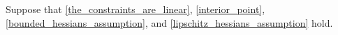 Suppose that \cref{the_constraints_are_linear}, \cref{interior_point}, \cref{bounded_hessians_assumption}, and \cref{lipschitz_hessians_assumption} hold.
